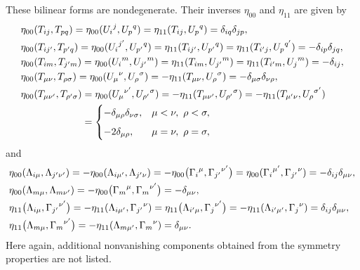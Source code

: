 \documentclass[10pt,a4paper]{amsart}
\numberwithin{equation}{section}
\theoremstyle{definition}
\begin{document}
These bilinear forms are nondegenerate. Their inverses $\eta_{00}$ and $\eta_{11}$ are given by
\begin{align*}
	&\eta_{00}(T_{ij},T_{pq})= \eta_{00}({U_i}^j, {U_p}^q) = \eta_{11}(T_{ij},{U_p}^q) = \delta_{iq} \delta_{jp},
	\notag\\
	&\eta_{00}(T_{ij'}, T_{p'q})= \eta_{00}({U_i}^{j'}, {U_{p'}}^{q}) = \eta_{11}(T_{ij'},{U_{p'}}^q) = \eta_{11}(T_{i'j},{U_p}^{q'}) = -\delta_{ip} \delta_{jq},
	\notag \\
&	\eta_{00}(T_{im}, T_{j'm})= \eta_{00}({U_i}^m,{U_{j'}}^m) = \eta_{11}(T_{im},{U_{j'}}^m) = \eta_{11}(T_{i'm}, {U_j}^m) = -\delta_{ij},
	\notag \\
&	\eta_{00}(T_{\mu\nu}, T_{\rho\sigma})= \eta_{00}({U_{\mu}}^{\nu},{U_{\rho}}^{\sigma}) = -\eta_{11}(T_{\mu\nu},{U_{\rho}}^{\sigma})= -\delta_{\mu\sigma} \delta_{\nu\rho},
	\notag\\
&	\eta_{00}(T_{\mu\nu'}, T_{\rho'\sigma})= \eta_{00}({U_{\mu}}^{\nu'},{U_{\rho'}}^{\sigma}) = -\eta_{11}(T_{\mu\nu'},{U_{\rho'}}^{\sigma}) =
	-\eta_{11}(T_{\mu'\nu},{U_{\rho}}^{\sigma'})
	\notag\\
	&\hphantom{\eta_{00}(T_{\mu\nu'}, T_{\rho'\sigma})} {} =
	\begin{cases}
		-\delta_{\mu\rho} \delta_{\nu\sigma}, & \mu < \nu, \ \rho < \sigma,
		\\[5pt]
		-2 \delta_{\mu\rho}, & \mu = \nu, \ \rho=\sigma,
	\end{cases}
\end{align*}
and
\begin{align*}
	&\eta_{00}(\Lambda_{i\mu}, \Lambda_{j'\nu'})= -\eta_{00}(\Lambda_{i\mu'}, \Lambda_{j'\nu}) = -\eta_{00}\bigl({\Gamma_i}^{\mu}, {\Gamma_{j'}}^{\nu'}\bigr) = \eta_{00}({\Gamma_i}^{\mu'}, {\Gamma_{j'}}^{\nu}) = -\delta_{ij}\delta_{\mu\nu},
	\notag\\
&	\eta_{00}(\Lambda_{m\mu}, \Lambda_{m\nu'})= -\eta_{00}\bigl({\Gamma_m}^{\mu}, {\Gamma_m}^{\nu'}\bigr) = -\delta_{\mu\nu},
	\notag\\
&	\eta_{11}\bigl(\Lambda_{i\mu},{\Gamma_{j'}}^{\nu'}\bigr)= -\eta_{11}(\Lambda_{i\mu'},{\Gamma_{j'}}^{\nu}) = \eta_{11}\bigl(\Lambda_{i'\mu},{\Gamma_{j}}^{\nu'}\bigr) = -\eta_{11}(\Lambda_{i'\mu'},{\Gamma_j}^{\nu}) = \delta_{ij} \delta_{\mu\nu},
	\notag\\
&	\eta_{11}\bigl(\Lambda_{m\mu},{\Gamma_m}^{\nu'}\bigr)=-\eta_{11}(\Lambda_{m\mu'},{\Gamma_m}^{\nu}) = \delta_{\mu\nu}.
\end{align*}
Here again, additional nonvanishing components obtained from the symmetry properties are not listed.
\end{document}
